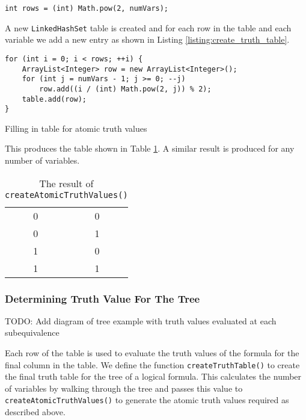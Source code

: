\documentclass{report}
\begin{document}
\begin{listing}[ht]
\begin{verbatim} 
int rows = (int) Math.pow(2, numVars);
\end{verbatim}
\end{listing}

A new {\tt LinkedHashSet} table is created and for each row in the table and each variable we add a new entry as shown in Listing \ref{listing:create_truth_table}.

\begin{listing}[ht]
\begin{verbatim} 
for (int i = 0; i < rows; ++i) {
    ArrayList<Integer> row = new ArrayList<Integer>();
    for (int j = numVars - 1; j >= 0; --j)
        row.add((i / (int) Math.pow(2, j)) % 2);
    table.add(row);
}
\end{verbatim}
\caption{Filling in table for atomic truth values}
\label{listing:create_truth_table}
\end{listing}

This produces the table shown in Table \ref{table:generated_atomic_truth_values}. A similar result is produced for any number of variables.

\begin{table}[h]
  \begin{center}
    \begin{tabular}{ || c | c || }
      \hline
      0 & 0 \\
      0 & 1 \\
      1 & 0 \\
      1 & 1 \\
      \hline
    \end{tabular}
  \end{center}
  \caption{The result of {\tt createAtomicTruthValues()}}
  \label{table:generated_atomic_truth_values}
\end{table}

\subsubsection{Determining Truth Value For The Tree}

TODO: Add diagram of tree example with truth values evaluated at each subequivalence

Each row of the table is used to evaluate the truth values of the formula for the final column in the table. We define the function {\tt createTruthTable()} to create the final truth table for the tree of a logical formula. This calculates the number of variables by walking through the tree and passes this value to {\tt createAtomicTruthValues()} to generate the atomic truth values required as described above. 
\end{document}
